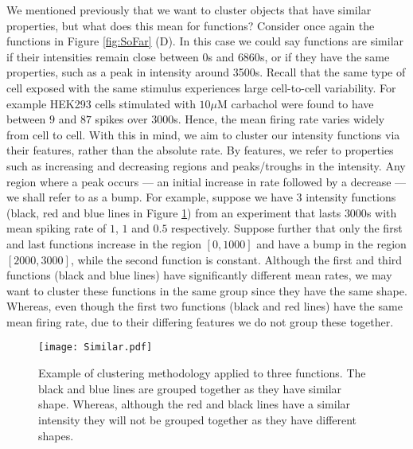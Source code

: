 \documentclass[../main.tex]{subfiles}
\begin{document}
 We mentioned previously that we want to cluster objects that have similar properties, but what does this mean for functions? Consider once again the functions in Figure \ref{fig:SoFar} (D). In this case we could say functions are similar if their intensities remain close between $0$s and $6860$s, or if they have the same properties, such as a peak in intensity around 3500s. Recall that  the same type of cell exposed with the same stimulus experiences large cell-to-cell variability. For example HEK293 cells stimulated with $10\mu\mathrm{M}$ carbachol were found to have between $9$ and $87$  spikes over $3000$s. Hence, the mean firing rate varies widely from cell to cell. With this in mind, we aim to cluster our intensity functions via their features, rather than the absolute rate. By features, we refer to properties such as increasing and decreasing regions and peaks/troughs in the intensity. Any region where a peak occurs --- an initial increase in rate followed by a decrease --- we shall refer to as a bump.   For example, suppose we have 3 intensity functions (black, red and blue lines in Figure \ref{fig:Similar})  from an experiment that lasts $3000$s with mean spiking rate of $1$, $1$ and $0.5$ respectively. Suppose further that only the first and last functions increase in the region $[0,1000]$ and have a bump in the region $[2000,3000]$,  while the second function is constant. Although the first and third functions (black and blue lines) have significantly different mean rates, we may want to cluster these functions in the same group since they have the same shape. Whereas, even though the first two functions (black and red lines) have the same mean firing rate, due to their differing features we do not group these together. 

     \begin{figure}[t!]
   \hrulefill
   \begin{center} 
    {\texttt{[image: Similar.pdf]} }
    \end{center}     
    \caption{Example of clustering methodology applied to three functions. The black and blue lines are grouped together as they have similar shape. Whereas, although the red and black lines have a similar intensity they will not be grouped together as they have different shapes.}
    \label{fig:Similar}
    \hrulefill
    \end{figure}
\end{document}
